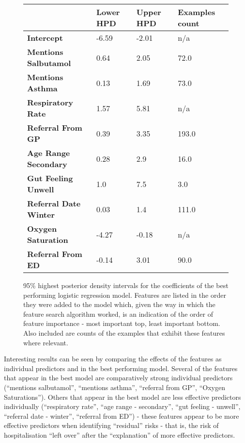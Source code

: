 \begin{figure}[h]
    \centering
    \renewcommand{\arraystretch}{1.1}
    \scriptsize
    \begin{tabular}{P{43mm} P{15mm} P{15mm} P{18mm} }
        \toprule
        & \textbf{Lower HPD} & \textbf{Upper HPD} & \textbf{Examples count} \\\toprule
        \textbf{Intercept} & -6.59 & -2.01 & n/a \\
        \textbf{Mentions Salbutamol} & 0.64 & 2.05 & 72.0 \\
        \textbf{Mentions Asthma} & 0.13 & 1.69 & 73.0 \\
        \textbf{Respiratory Rate} & 1.57 & 5.81 & n/a \\
        \textbf{Referral From GP} & 0.39 & 3.35 & 193.0 \\
        \textbf{Age Range Secondary} & 0.28 & 2.9 & 16.0 \\
        \textbf{Gut Feeling Unwell} & 1.0 & 7.5 & 3.0 \\
        \textbf{Referral Date Winter} & 0.03 & 1.4 & 111.0 \\
        \textbf{Oxygen Saturation} & -4.27 & -0.18 & n/a \\
        \textbf{Referral From ED} & -0.14 & 3.01 & 90.0 \\\toprule
    \end{tabular}
    \caption[95\% highest posterior density intervals for the coefficients of the best performing logistic regression model]{95\% highest posterior density intervals for the coefficients of the best performing logistic regression model. Features are listed in the order they were added to the model which, given the way in which the feature search algorithm worked, is an indication of the order of feature importance - most important top, least important bottom. Also included are counts of the examples that exhibit these features where relevant.}
    \label{fig:best-feature-hpds}
\end{figure}

Interesting results can be seen by comparing the effects of the features as individual predictors and in the best performing model. Several of the features that appear in the best model are comparatively strong individual predictors (``mentions salbutamol'', ``mentions asthma'', ``referral from GP'', ``Oxygen Saturations''). Others that appear in the best model are less effective predictors individually (``respiratory rate'', ``age range - secondary'', ``gut feeling - unwell'', ``referral date - winter'', ``referral from ED'') - these features appear to be more effective predictors when identifying ``residual'' risks - that is, the risk of hospitalisation ``left over'' after the ``explanation'' of more effective predictors.

